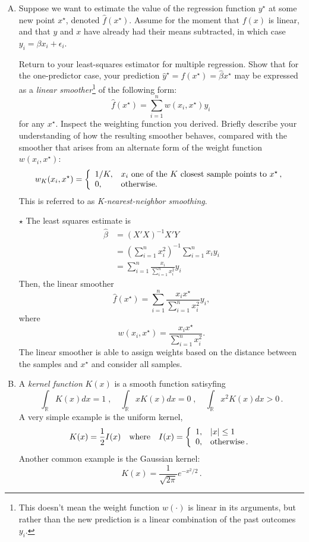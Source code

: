\documentclass[11pt]{article}
\newcommand{\jie}{$\star$ }
\begin{document}
\begin{enumerate}[(A)]
\item Suppose we want to estimate the value of the regression function $y^{\star}$ at some new point $x^\star$, denoted $\hat{f}(x^{\star})$.  Assume for the moment that $f(x)$ is linear, and that $y$ and $x$ have already had their means subtracted, in which case $y_i = \beta x_i + \epsilon_i$.

Return to your least-squares estimator for multiple regression.  Show that for the one-predictor case, your prediction $\hat{y}^{\star} = f(x^{\star}) = \hat{\beta} x^{\star}$ may be expressed as a \textit{linear smoother}\footnote{This doesn't mean the weight function $w(\cdot)$ is linear in its arguments, but rather than the new prediction is a linear combination of the past outcomes $y_i$.} of the following form:
$$
\hat{f}(x^{\star}) =  \sum_{i=1}^n w(x_i, x^{\star}) y_i   \, 
$$
for any $x^{\star}$.  Inspect the weighting function you derived.  Briefly describe your understanding of how the resulting smoother behaves, compared with the smoother that arises from an alternate form of the weight function $w(x_i, x^{\star})$:
$$
w_K(x_i, x^{\star}) = \left \{
\begin{array}{l l}
1/K, & \mbox{$x_i$ one of the $K$ closest sample points to $x^{\star}$} \, ,\\
0, & \mbox{otherwise.} \\
\end{array}
\right.
$$
This is referred to as \textit{K-nearest-neighbor smoothing}.

\bigskip \jie
The least squares estimate is
\begin{align*}
    \hat{\beta} &= (X'X)^{-1}X'Y \\
    &= (\sum_{i=1}^n x_i^2)^{-1} \sum_{i=1}^n x_i y_i \\
    &= \sum_{i=1}^n \frac{x_i}{\sum_{i=1}^n x_i^2} y_i
\end{align*}
Then, the linear smoother
$$\hat{f}(x^{\star}) = \sum_{i=1}^n \frac{x_i x^\star}{\sum_{i=1}^n x_i^2} y_i,$$
where 
$$ w(x_i, x^{\star}) = \frac{x_i x^\star}{\sum_{i=1}^n x_i^2}.$$
The linear smoother is able to assign weights based on the distance between the samples and $x^\star$ and consider all samples.
\bigskip

\item A \textit{kernel function} $K(x)$ is a smooth function satisyfing
$$
\int_\mathbb{R} K(x) dx = 1 \; , \quad \int_\mathbb{R} x K(x) dx = 0 \; , \quad \int_\mathbb{R} x^2 K(x) dx > 0 \, .
$$
A very simple example is the uniform kernel,
$$
K(x) = \frac{1}{2} I(x) \quad \mbox{where} \quad I(x) = 
\left\{
\begin{array}{l l}
1, & |x| \leq 1 \\
0, & \mbox{otherwise} \, . \\
\end{array}
\right.
$$
Another common example is the Gaussian kernel:
$$
K(x) = \frac{1}{\sqrt{2 \pi}} e^{-x^2/2} \, .
$$


\end{enumerate}
\end{document}
